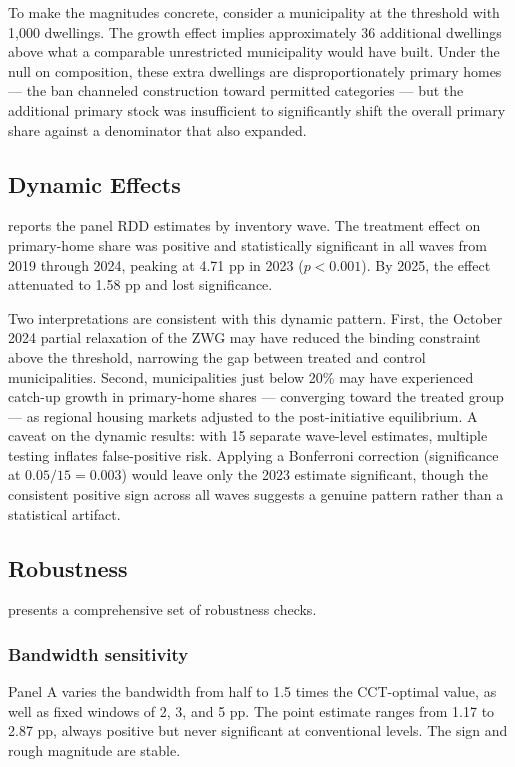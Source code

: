 \documentclass[12pt]{article}
\begin{document}
To make the magnitudes concrete, consider a municipality at the threshold with 1,000 dwellings. The growth effect implies approximately 36 additional dwellings above what a comparable unrestricted municipality would have built. Under the null on composition, these extra dwellings are disproportionately primary homes --- the ban channeled construction toward permitted categories --- but the additional primary stock was insufficient to significantly shift the overall primary share against a denominator that also expanded.



\subsection{Dynamic Effects}

 reports the panel RDD estimates by inventory wave. The treatment effect on primary-home share was positive and statistically significant in all waves from 2019 through 2024, peaking at 4.71 pp in 2023 ($p < 0.001$). By 2025, the effect attenuated to 1.58 pp and lost significance.

Two interpretations are consistent with this dynamic pattern. First, the October 2024 partial relaxation of the ZWG may have reduced the binding constraint above the threshold, narrowing the gap between treated and control municipalities. Second, municipalities just below 20\% may have experienced catch-up growth in primary-home shares --- converging toward the treated group --- as regional housing markets adjusted to the post-initiative equilibrium. A caveat on the dynamic results: with 15 separate wave-level estimates, multiple testing inflates false-positive risk. Applying a Bonferroni correction (significance at $0.05/15 = 0.003$) would leave only the 2023 estimate significant, though the consistent positive sign across all waves suggests a genuine pattern rather than a statistical artifact.



\subsection{Robustness}

 presents a comprehensive set of robustness checks.

\subsubsection*{Bandwidth sensitivity} Panel A varies the bandwidth from half to 1.5 times the CCT-optimal value, as well as fixed windows of 2, 3, and 5 pp. The point estimate ranges from 1.17 to 2.87 pp, always positive but never significant at conventional levels. The sign and rough magnitude are stable.
\end{document}

